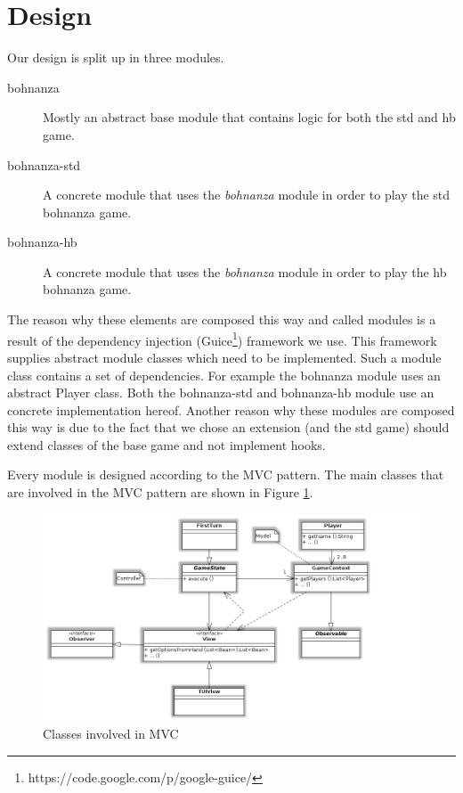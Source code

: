 \section{Design}

Our design is split up in three modules.
\begin{description}
    \item[bohnanza] {Mostly an abstract base module that contains logic for both the \gls{std} and
    \gls{hb} game.}
    \item[bohnanza-std] {A concrete module that uses the \emph{bohnanza} module in order to play
    the \gls{std} bohnanza game.}
    \item[bohnanza-hb] {A concrete module that uses the \emph{bohnanza} module in order to play the
    \gls{hb} bohnanza game.}
\end{description}
The reason why these elements are composed this way and called modules is a result of the dependency
injection (Guice\footnote{https://code.google.com/p/google-guice/}) framework we use. This framework supplies abstract module classes which
need to be implemented. Such a module class contains a set of dependencies. For example the bohnanza module uses an abstract Player class.
Both the bohnanza-std and bohnanza-hb module use an concrete implementation hereof. Another reason why these modules are composed this way
is due to the fact that we chose an extension (and the \gls{std} game) should extend classes of the base game and not implement hooks. 

Every module is designed according to the MVC pattern. The main classes that are involved in the MVC pattern are shown in Figure
\ref{fig:design:mvc}.

 \begin{figure}[h!]
    \includegraphics[width=\textwidth]{../img/Mvc}
    \caption{Classes involved in MVC}
    \label{fig:design:mvc}
\end{figure}


